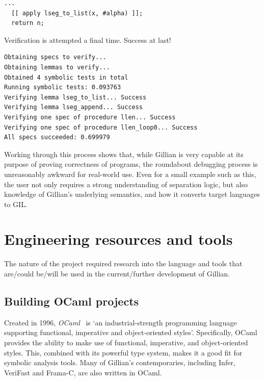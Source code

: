 \begin{lstlisting}[style=code, numbers=none, caption={Applying \texttt{lseg\_to\_list}}]
  ...
  [[ apply lseg_to_list(x, #alpha) ]];
  return n;
\end{lstlisting}

Verification is attempted a final time. Success at last!

\begin{lstlisting}[style=code, numbers=none, caption={Verification: WISL list length success}]
Obtaining specs to verify...
Obtaining lemmas to verify...
Obtained 4 symbolic tests in total
Running symbolic tests: 0.093763
Verifying lemma lseg_to_list... Success
Verifying lemma lseg_append... Success
Verifying one spec of procedure llen... Success
Verifying one spec of procedure llen_loop0... Success
All specs succeeded: 0.699979
\end{lstlisting}

Working through this process shows that, while Gillian is very capable at its
purpose of proving correctness of programs, the roundabout debugging process is
unreasonably awkward for real-world use. Even for a small example such as this,
the user not only requires a strong understanding of separation logic, but also
knowledge of Gillian's underlying semantics, and how it converts target
languages to GIL.\@

\section{Engineering resources and tools}\label{sec:background:engineering-tools}

The nature of the project required research into the language and tools that
are/could be/will be used in the current/further development of Gillian.

\subsection{Building OCaml projects}

Created in 1996, \textit{OCaml}~\cite{ocaml} is `an industrial-strength
programming language supporting functional, imperative and object-oriented
styles'. Specifically, OCaml provides the ability to make use of functional,
imperative, and object-oriented styles. This, combined with its powerful type
system, makes it a good fit for symbolic analysis tools. Many of Gillian's
contemporaries, including Infer, VeriFast and Frama-C, are also written in OCaml.

